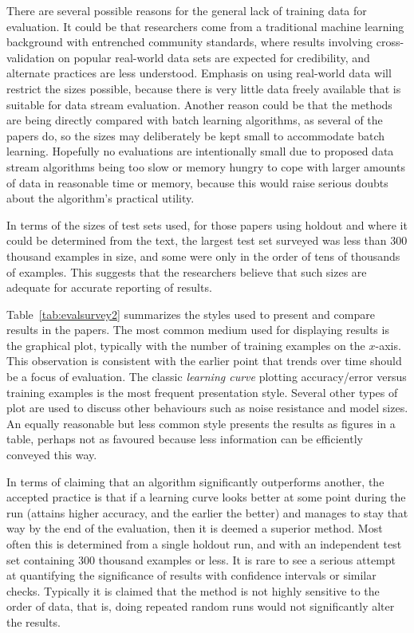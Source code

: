 There are several possible reasons for the general lack of training data for evaluation. It could be that researchers come from a traditional machine learning background with entrenched community standards, where results involving cross-validation on popular real-world data sets are expected for credibility, and alternate practices are less understood. Emphasis on using real-world data will restrict the sizes possible, because %
there is very little data freely available that is suitable for data stream evaluation. Another reason could be that the methods are being directly compared with batch learning algorithms, as several of the papers do, so the sizes may deliberately be kept small to accommodate batch learning. Hopefully no evaluations are intentionally small due to proposed data stream algorithms being too slow or memory hungry to cope with larger amounts of data in reasonable time or memory, because this would raise serious doubts about the algorithm's practical utility.

In terms of the sizes of test sets used, for those papers using holdout and where it could be determined from the text, the largest test set surveyed was less than 300 thousand examples in size, and some were only in the order of tens of thousands of examples. This suggests that the researchers believe that such sizes are adequate for accurate reporting of results.

Table~\ref{tab:evalsurvey2} summarizes the styles used to present and compare results in the papers. The most common medium used for displaying results is the graphical plot, typically with the number of training examples on the $x$-axis. This observation is consistent with the earlier point that trends over time should be a focus of evaluation. The classic {\em learning curve} plotting accuracy/error versus training examples is the most frequent presentation style. Several other types of plot are used to discuss other behaviours such as noise resistance and model sizes. An equally reasonable but less common style presents the results as figures in a table, perhaps not as favoured because less information can be efficiently conveyed this way.

In terms of claiming that an algorithm significantly outperforms another, the accepted practice is that if a learning curve looks better at some point during the run (attains higher accuracy, and the earlier the better) and manages to stay that way by the end of the evaluation, then it is deemed a superior method. Most often this is determined from a single holdout run, and with an independent test set containing 300 thousand examples or less. It is rare to see a serious attempt at quantifying the significance of results with confidence intervals or similar checks. Typically it is claimed that the method is not highly sensitive to the order of data, that is, doing repeated random runs would not significantly alter the results.

